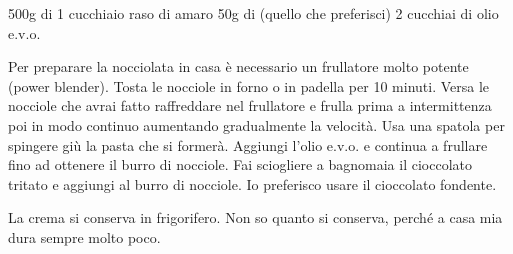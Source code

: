 \serves{-}%
\begin{ingreds}
	500g di 
	1 cucchiaio raso di  amaro
	50g di  (quello che preferisci)
	2 cucchiai di olio e.v.o.


\end{ingreds}

\begin{method}
	Per preparare la nocciolata in casa è necessario un frullatore molto potente (power blender). Tosta le nocciole in forno o in padella per 10 minuti. Versa le nocciole che avrai fatto raffreddare nel frullatore e frulla prima a intermittenza poi in modo continuo aumentando gradualmente la velocità. Usa una spatola per spingere giù la pasta che si formerà. Aggiungi l'olio e.v.o. e continua a frullare fino ad ottenere il burro di nocciole. Fai sciogliere a bagnomaia il cioccolato tritato e aggiungi al burro di nocciole. Io preferisco usare il cioccolato fondente.

	La crema si conserva in frigorifero. Non so quanto si conserva, perché a casa mia dura sempre molto poco.


\end{method}




